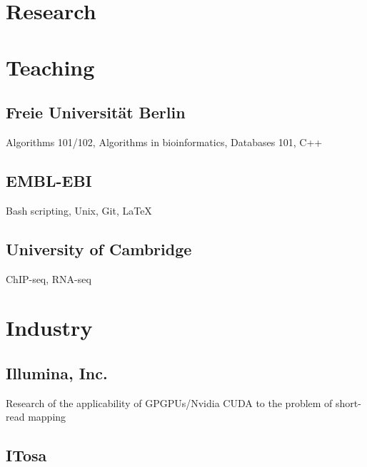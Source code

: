 \documentclass{klmr-cv}
\newcommand*\cpp{C++}
\begin{document}
\section{Research}

\section{Teaching}

\subsection{Freie Universität Berlin}

\date{2008--2011}
\item{}
\item{Algorithms 101/102, Algorithms in bioinformatics, Databases 101, \cpp}

\subsection{EMBL-EBI}

\date{2011--2014}
\item{}
\item{Bash scripting, Unix, Git, \LaTeX}

\subsection{University of Cambridge}

\date{2013--2015}
\item{}
\item{ChIP-seq, RNA-seq}

\section{Industry}

\subsection{Illumina, Inc.}

\date{Oct 2008--Feb 2009}
\item{}
\item{Research of the applicability of GPGPUs/Nvidia CUDA to the problem of
        short-read mapping}

\subsection{ITosa}
\end{document}
